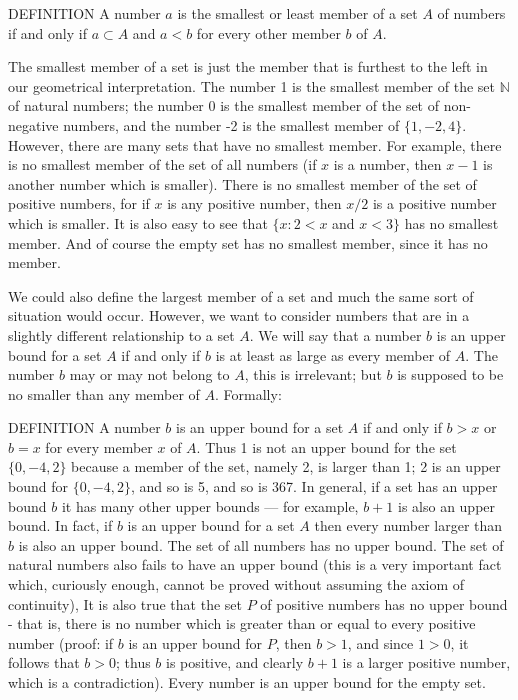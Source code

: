 \documentclass[a4paper]{article}
\begin{document}
DEFINITION A number $a$ is the smallest or least member of a set $A$ of numbers if and only if $a \subset A$ and $a < b$ for
every other member $b$ of $A$.

The smallest member of a set is just the member that is furthest to the left in our geometrical interpretation. The number 1 is
the smallest member of the set $\mathbb{N}$ of natural numbers; the number 0 is the smallest member of the set of non-negative numbers,
and the number -2 is the smallest member of $\{1, -2, 4\}$. However, there are many sets that have no smallest member. For example,
there is no smallest member of the set of all numbers (if $x$ is a number, then $x - 1$ is another number which is smaller).
There is no smallest member of the set of positive numbers, for if $x$ is any positive number, then $x/2$ is a positive number
which is smaller. It is also easy to see that $\{x : 2 < x$ and $x < 3\}$ has no smallest member. And of course the empty set
has no smallest member, since it has no member.

We could also define the largest member of a set and much the same sort of situation would occur. However, we want to consider
numbers that are in a slightly different relationship to a set $A$. We will say that a number $b$ is an upper bound for a set $A$
if and only if $b$ is at least as large as every member of $A$. The number $b$ may or may not belong to $A$, this is irrelevant;
but $b$ is supposed to be no smaller than any member of $A$. Formally:

DEFINITION A number $b$ is an upper bound for a set $A$ if and only if $b > x$ or $b = x$ for every member $x$ of $A$.
Thus 1 is not an upper bound for the set $\{0, -4, 2\}$ because a member of the set, namely 2, is larger than 1; 2 is an upper bound
for $\{0, -4, 2\}$, and so is 5, and so is 367. In general, if a set has an upper bound $b$ it has many other upper bounds ---
for example, $b + 1$ is also an upper bound. In fact, if $b$ is an upper bound for a set $A$ then every number larger than $b$ is also
an upper bound. The set of all numbers has no upper bound. The set of natural numbers also fails to have an upper bound (this is
a very important fact which, curiously enough, cannot be proved without assuming the axiom of continuity), It is also true that
the set $P$ of positive numbers has no upper bound - that is, there is no number which is greater than or equal to every positive
number (proof: if $b$ is an upper bound for $P$, then $b > 1$, and since $1 > 0$, it follows that $b > 0$; thus $b$ is positive,
and clearly $b + 1$ is a larger positive number, which is a contradiction). Every number is an upper bound for the empty set.
\end{document}
